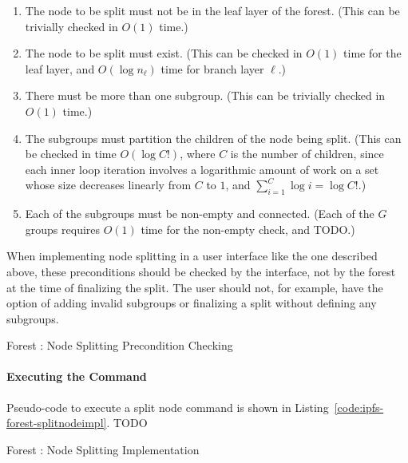 \begin{enumerate}

\item The node to be split must not be in the leaf layer of the forest. (This can be trivially checked in $O(1)$ time.)
\item The node to be split must exist. (This can be checked in $O(1)$ time for the leaf layer, and $O(\log n_\ell)$ time for branch layer $\ell$.)
\item There must be more than one subgroup. (This can be trivially checked in $O(1)$ time.)
\item The subgroups must partition the children of the node being split. (This can be checked in time $O(\log C!)$, where $C$ is the number of children, since each inner loop iteration involves a logarithmic amount of work on a set whose size decreases linearly from $C$ to $1$, and $\sum_{i=1}^C \log i = \log C!$.)
\item Each of the subgroups must be non-empty and connected. (Each of the $G$ groups requires $O(1)$ time for the non-empty check, and TODO.)

\end{enumerate}

When implementing node splitting in a user interface like the one described above, these preconditions should be checked by the interface, not by the forest at the time of finalizing the split. The user should not, for example, have the option of adding invalid subgroups or finalizing a split without defining any subgroups.

\begin{stulisting}[p]
\caption{Forest : Node Splitting Precondition Checking}
\label{code:ipfs-forest-splitnode}

\end{stulisting}

\paragraph{Executing the Command}

Pseudo-code to execute a split node command is shown in Listing~\ref{code:ipfs-forest-splitnodeimpl}. TODO

\begin{stulisting}[p]
\caption{Forest : Node Splitting Implementation}
\label{code:ipfs-forest-splitnodeimpl}

\end{stulisting}

